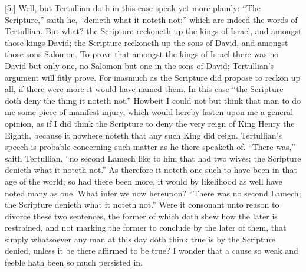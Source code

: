 [5.] Well, but Tertullian doth in this case speak yet more plainly: “The Scripture,” saith he, “denieth what it noteth not;” which are indeed the words of Tertullian. But what? the Scripture reckoneth up the kings of Israel, and amongst those kings David; the Scripture reckoneth up the sons of David, and amongst those sons Salomon. To prove that amongst the kings of Israel there was no David but only one, no Salomon but one in the sons of David; Tertullian’s argument will fitly prove. For inasmuch as the Scripture did propose to reckon up all, if there were more it would have named them. In this case “the Scripture doth deny the thing it noteth not.” Howbeit I could not but think that man to do me some piece of manifest injury, which would hereby fasten upon me a general opinion, as if I did think the Scripture to deny the very reign of King Henry the Eighth, because it nowhere noteth that any such King did reign. Tertullian’s speech is probable concerning such matter as he there speaketh of. “There was,” saith Tertullian, “no second Lamech like to him that had two wives; the Scripture denieth what it noteth not.” As therefore it noteth one such to have been in that age of the world; so had there been more, it would by likelihood as well have noted many as one. What infer we now hereupon? “There was no second Lamech; the Scripture denieth what it noteth not.” Were it consonant unto reason to divorce these two sentences, the former of which doth shew how the later is restrained, and not marking the former to conclude by the later of them, that simply whatsoever any man at this day doth think true is by the Scripture denied, unless it be there affirmed to be true? I wonder that a cause so weak and feeble hath been so much persisted in.

